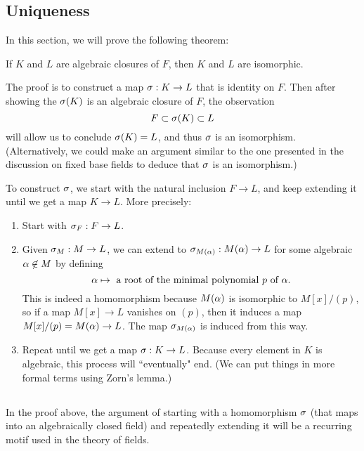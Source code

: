 \subsection{Uniqueness}
In this section, we will prove the following theorem:
\begin{center}
    If $K$ and $L$ are algebraic closures of $F$, then $K$ and $L$ are isomorphic.
\end{center}
The proof is to construct a map $\sigma: K \rightarrow L$ that is identity on $F$. Then after showing the $\sigma(K)$ is an algebraic closure of $F$, the observation
\[
    F \subset \sigma(K) \subset L
\]
will allow us to conclude $\sigma(K) = L$, and thus $\sigma$ is an isomorphism. (Alternatively, we could make an argument similar to the one presented in the discussion on fixed base fields to deduce that $\sigma$ is an isomorphism.)

To construct $\sigma$, we start with the natural inclusion $F \rightarrow L$, and keep extending it until we get a map $K \rightarrow L$. More precisely:
\begin{enumerate}
    \item Start with $\sigma_F : F \rightarrow L$.
    \item Given $\sigma_M: M \rightarrow L$, we can extend to $\sigma_{M(\alpha)}: M(\alpha) \rightarrow L$ for some algebraic $\alpha \not \in M$ by defining
        \[
            \alpha \mapsto \text{ a root of the minimal polynomial $p$ of $\alpha$.}
        \]
        This is indeed a homomorphism because $M(\alpha)$ is isomorphic to $M[x]/(p)$, so if a map $M[x] \rightarrow L$ vanishes on $(p)$, then it induces a map $M[x]/(p) = M(\alpha) \rightarrow L$. The map $\sigma_{M(\alpha)}$ is induced from this way.
    \item Repeat until we get a map $\sigma: K \rightarrow L$. Because every element in $K$ is algebraic, this process will ``eventually" end. (We can put things in more formal terms using Zorn's lemma.)
\end{enumerate}

\subsection{}
In the proof above, the argument of starting with a homomorphism $\sigma$ (that maps into an algebraically closed field) and repeatedly extending it will be a recurring motif used in the theory of fields.

